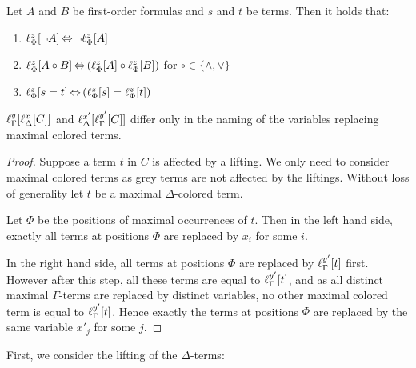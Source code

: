 \begin{lemma} 
  \label{lemma:lift_commute}
  Let $A$ and $B$ be first-order formulas and $s$ and $t$ be terms. Then it holds that:
  \begin{enumerate}
    \item $\lift{\Phi}{\lnot A}{z} \semiff{} \lnot \lift{\Phi}{A}{z}$
    \item $\lift{\Phi}{A \circ B}{z} \semiff{} ( \lift{\Phi}{A}{z} \circ \lift{\Phi}{B}{z} )$ for  $\circ \in \{\land,       \lor\}$
    \item $\lift{\Phi}{s = t}{z} \semiff{} ( \lift{\Phi}{s}{z} = \lift{\Phi}{t}{z} )$
  \end{enumerate}
\end{lemma}
\begin{lemma}

	$ \lft{\Gamma}{y}{ \lft{\Delta}{x}{ C}  }$ and 
	$ \lft{\Delta}{x'}{ \lft{\Gamma}{y'}{ C}  }$
	differ only in the naming of the variables replacing maximal colored terms.
	\label{lemma:naming_of_colored_variables}

\end{lemma}
\begin{proof}
	Suppose a term $t$ in $C$ is affected by a lifting.
	We only need to consider maximal colored terms as grey terms are not affected by the liftings.
	Without loss of generality let $t$ be a maximal $\Delta$-colored term.

	Let $\Phi$ be the positions of maximal occurrences of $t$.
	Then in the left hand side, exactly all terms at positions $\Phi$ are replaced by $x_i$ for some $i$.

	In the right hand side, all terms at positions $\Phi$ are replaced by $\lft{\Gamma}{y'}{t}$ first. 
	However after this step,
	all these terms are equal to $\lft{\Gamma}{y'}{t}$, and as all distinct maximal $\Gamma$-terms are replaced by distinct variables, no other maximal colored term is equal to $\lft{\Gamma}{y'}{t}$.
	Hence exactly the terms at positions $\Phi$ are replaced by the same variable $x'_j$ for some $j$.
\end{proof}


First, we consider the lifting of the $\Delta$-terms:\nopagebreak[4]

